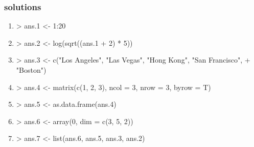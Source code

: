 \documentclass[handout]{beamer}
\newcommand{\red}{\color{red}}
\begin{document}
\begin{frame}[fragile]
\frametitle{solutions}
\footnotesize
\begin{enumerate}
\item \red \footnotesize 
\begin{Schunk}
\begin{Sinput}
> ans.1 <- 1:20
\end{Sinput}
\end{Schunk}
\item \red \footnotesize
\begin{Schunk}
\begin{Sinput}
> ans.2 <- log(sqrt((ans.1 + 2) * 5))
\end{Sinput}
\end{Schunk}
\item \red \footnotesize
\begin{Schunk}
\begin{Sinput}
> ans.3 <- c("Los Angeles", "Las Vegas", "Hong Kong", "San Francisco", 
+     "Boston")
\end{Sinput}
\end{Schunk}
\item \red \footnotesize
\begin{Schunk}
\begin{Sinput}
> ans.4 <- matrix(c(1, 2, 3), ncol = 3, nrow = 3, byrow = T)
\end{Sinput}
\end{Schunk}
\item \red \footnotesize
\begin{Schunk}
\begin{Sinput}
> ans.5 <- as.data.frame(ans.4)
\end{Sinput}
\end{Schunk}
\item
\begin{Schunk}
\begin{Sinput}
> ans.6 <- array(0, dim = c(3, 5, 2))
\end{Sinput}
\end{Schunk}
\item 
\begin{Schunk}
\begin{Sinput}
> ans.7 <- list(ans.6, ans.5, ans.3, ans.2)
\end{Sinput}
\end{Schunk}
\end{enumerate}
\end{frame}
\end{document}
